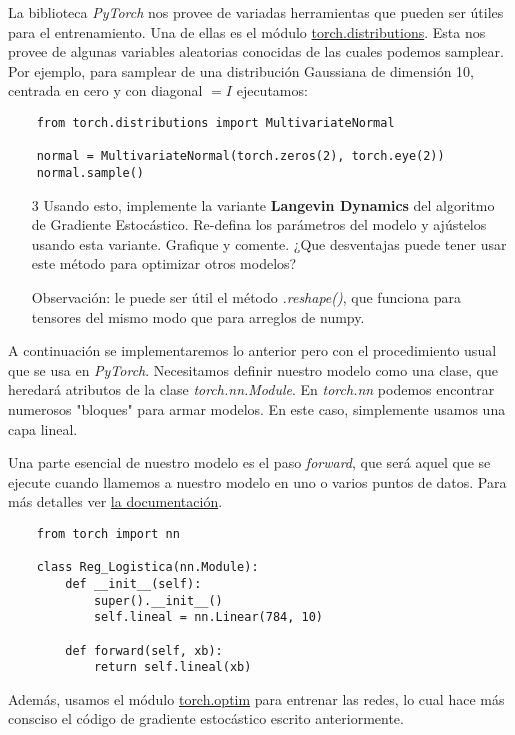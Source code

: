 La biblioteca \textit{PyTorch} nos provee de variadas herramientas que pueden ser útiles para el entrenamiento. Una de ellas es el módulo \href{https://pytorch.org/docs/stable/distributions.html}{torch.distributions}. Esta nos provee de algunas variables aleatorias conocidas de las cuales podemos samplear. Por ejemplo, para samplear de una distribución Gaussiana de dimensión 10, centrada en cero y con diagonal $=I$ ejecutamos:
\begin{verbatim}
    from torch.distributions import MultivariateNormal

    normal = MultivariateNormal(torch.zeros(2), torch.eye(2))
    normal.sample()
\end{verbatim}

\begin{itemize}
    \item[3] Usando esto, implemente la variante \textbf{Langevin Dynamics} del algoritmo de Gradiente Estocástico. Re-defina los parámetros del modelo y ajústelos usando esta variante. Grafique y comente. ¿Que desventajas puede tener usar este método para optimizar otros modelos?

    Observación: le puede ser útil el método \textit{.reshape()}, que funciona para tensores del mismo modo que para arreglos de numpy. 
\end{itemize}

A continuación se implementaremos lo anterior pero con el procedimiento usual que se usa en \textit{PyTorch}. Necesitamos definir nuestro modelo como una clase, que heredará atributos de la clase \textit{torch.nn.Module}. En \textit{torch.nn} podemos encontrar numerosos "bloques" para armar modelos. En este caso, simplemente usamos una capa lineal.

\newp Una parte esencial de nuestro modelo es el paso \textit{forward}, que será aquel que se ejecute cuando llamemos a nuestro modelo en uno o varios puntos de datos. Para más detalles ver \href{https://pytorch.org/docs/stable/nn.html}{la documentación}.

\begin{verbatim}
    from torch import nn

    class Reg_Logistica(nn.Module):
        def __init__(self):
            super().__init__()
            self.lineal = nn.Linear(784, 10)
    
        def forward(self, xb):
            return self.lineal(xb)
\end{verbatim}

Además, usamos el módulo \href{https://pytorch.org/docs/stable/optim.html}{torch.optim} para entrenar las redes, lo cual hace más consciso el código de gradiente estocástico escrito anteriormente.

